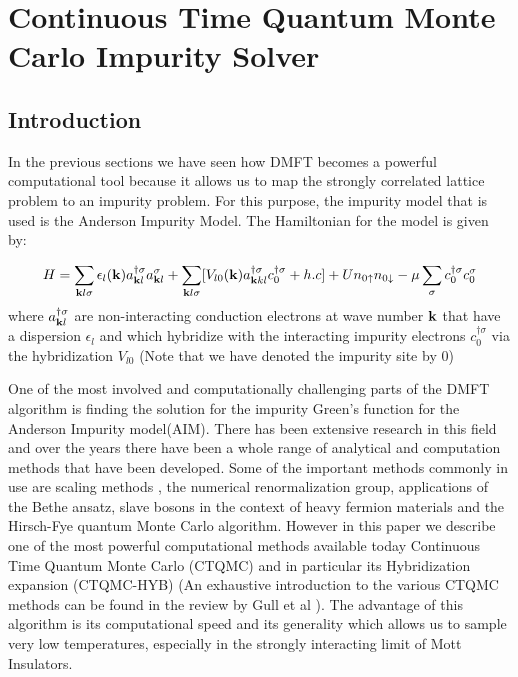 \documentclass[10pt]{ruthesis}
\begin{document}
\pagebreak
\chapter{Continuous Time Quantum Monte Carlo Impurity Solver}
\section{Introduction}
In the previous sections we have seen how DMFT becomes a powerful computational tool because it allows us to map the strongly correlated lattice problem to an impurity problem. For this purpose, the impurity model that is used is the Anderson Impurity Model\cite{AIM}. The Hamiltonian for the model is given by:

\begin{equation}
H=\sum_{\mathbf{k}l\sigma} \epsilon_{l}(\mathbf{k})a^{\dagger\sigma}_{\mathbf{k} l}a^{\sigma}_{\mathbf{k} l} +\sum_{\mathbf{k} l\sigma}[V_{l0}( \mathbf{k} )a^{\dagger\sigma}_{\mathbf{k} k l}c^{\dagger\sigma}_{0} +h.c] +Un_{0\uparrow}n_{0\downarrow}-\mu\sum_{\sigma}c^{\dagger \sigma}_{0}c^{\sigma}_{0}
\end{equation}
where $a^{\dagger\sigma}_{\mathbf{k} l}$ are non-interacting conduction electrons at wave number $\mathbf{k}$ that have a dispersion $\epsilon_{l}$ and which hybridize with the interacting impurity electrons $c^{\dagger\sigma}_{0}$ via the hybridization $V_{l0}$ (Note that we have denoted the impurity site by 0)

One of the most involved and computationally challenging parts of the DMFT algorithm is finding the solution for the impurity Green's function for the Anderson Impurity model(AIM). There has been extensive research in this field and over the years there have been a whole range of analytical and computation methods that have been developed. Some of the important  methods commonly in use are scaling methods \cite{AndersonKondo}, the numerical renormalization group\cite{Wilson}, applications of the Bethe ansatz\cite{andrei}, slave bosons in the context of heavy fermion materials\cite{coleman} and the Hirsch-Fye quantum Monte Carlo algorithm\cite{hfye}. However in this paper we describe one of the most powerful computational methods available today Continuous Time Quantum Monte Carlo (CTQMC) and in particular its Hybridization expansion (CTQMC-HYB)\cite{wernerqmc} \cite{hauleqmc}(An exhaustive introduction to the various CTQMC methods can be found in the review by Gull et al \cite{millisqmc}). The  advantage of this algorithm is its computational speed and its generality which allows us to sample very low temperatures, especially in the strongly interacting limit of Mott Insulators.
\end{document}
